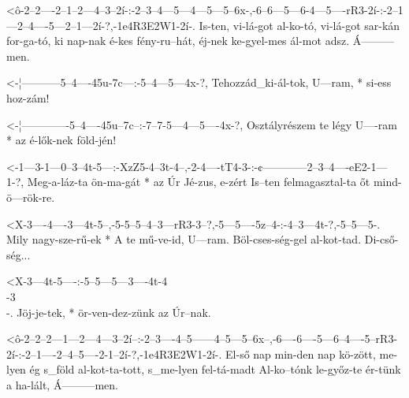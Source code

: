 

  {<ô-2--2----2--1--2---4--3--2í-:-2--3--4---5---4---5---5--6x-,-6--6---5---6-4---5----rR3-2í-:-2--1---2--4----5---2--1---2í-?,-1e4R3E2W1-2í-.}
  {   Is-ten, vi-lá-got al-ko-tó,  vi-lá-got sar-kán for-ga-tó,  ki nap-nak é-kes fény-ru--hát, éj-nek ke-gyel-mes ál-mot adsz. Á---------men.}

  {<-¦-----------5--4----45u-7c---:-5--4---5---4x-?,}
  {  Tehozzád_ki-ál-tok, U---ram, * si-ess hoz-zám!}

  {<-¦-------------5--4----45u--7c--:-7--7-5---4---5----4x-?,}
  {  Osztályrészem te légy U----ram * az é-lők-nek föld-jén!}

  {<-1---3-1---0--3--4t-5---:-XzZ5-4--3t-4--,-2-4----tT4-3-:-¢------------2--3--4----eE2-1---1-?,}
  {  Meg-a-láz-ta ön-ma-gát * az   Úr Jé-zus, e-zért Is--ten felmagasztal-ta őt mind-ö---rök-re.}

  {<X-3----4----3---4t-5--,-5-5--5--4--3---rR3-3--?,-5---5----5z--4-:-4--3---4t-?,-5--5---5-.}
  {   Mily nagy-sze-rű-ek * A te mű-ve-id, U---ram.  Böl-cses-ség-gel al-kot-tad.  Di-cső-ség...}


  {<X-3---4t-5----:-5--5---5---3----4t-4\\-3\\-.}
  {   Jöj-je-tek, * ör-ven-dez-zünk az Úr--nak.}


  {<ô-2--2--2---1---2---4---3--2í--:-2--3----4--5------4--5---5--6x--,-6----6----5---6--4----5--rR3-2í-:-2--1----2--4--5----2-1--2í-?,-1e4R3E2W1-2í-.}
  {   El-ső nap min-den nap kö-zött, me-lyen ég s_föld al-kot-ta-tott, s_me-lyen fel-tá-madt Al-ko--tónk le-győz-te ér-tünk a ha-lált, Á---------men.}


